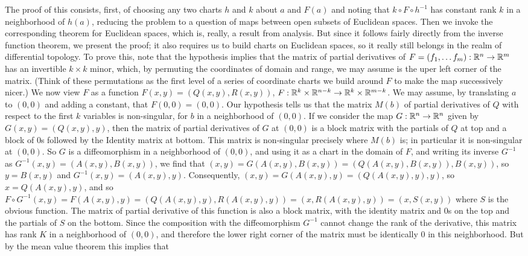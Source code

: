 The proof of this consists, first, of choosing any two charts $h$ and $k$ about $a$ and 
$F(a)$ and noting that $k\circ F\circ h^{-1}$ has constant rank $k$ in a 
neighborhood of $h(a)$, reducing the problem to a question of maps between open subsets of Euclidean 
spaces. Then we invoke the corresponding theorem for Euclidean spaces, which is,
really, a result from analysis. But since it follows fairly directly from the
inverse function theorem, we present the proof; it also requires us to build charts
on Euclidean spaces, so it really still belongs in the realm of differential topology.
To prove this, note that the hypothesis implies that the matrix of partial derivatives
of $F=(f_1,\ldots f_m):{\Bbb R}^n\rightarrow {\Bbb R}^m$ has an invertible $k\times k$ minor, which, by
permuting the coordinates of domain and range, we may assume is the uper left corner
of the matrix. (Think of these permutations as the first level of a series of coordinate
charts we build around $F$ to make the map successively nicer.) We now view $F$ as a 
function $F(x,y)=(Q(x,y),R(x,y))$,
$F:{\Bbb R}^k\times {\Bbb R}^{n-k}\rightarrow {\Bbb R}^k\times {\Bbb R}^{m-k}$. We may assume, by translating 
$a$ to $(0,0)$ and adding a constant,
that $F(0,0)=(0,0)$.
Our hypothesis tells us that the matrix $M(b)$ of partial derivatives of $Q$ with respect to the
first $k$ variables is non-singular, for $b$ in a neighborhood of $(0,0)$. 
If we consider the map $G:{\Bbb R}^n\rightarrow {\Bbb R}^n$ given
by $G(x,y)=(Q(x,y),y)$, then the matrix of partial derivatives of $G$ at $(0,0)$ is a 
block matrix with the partials of $Q$ at top and a block of $0$s followed by the Identity 
matrix at bottom. This matrix is non-singular precisely where $M(b)$ is; in particular it is
non-singular at $(0,0)$. So $G$ is a diffeomorphism in a neighborhood of $(0,0)$,
and using it as a chart in the domain of $F$, and writing its inverse $G^{-1}$ as
$G^{-1}(x,y)=(A(x,y),B(x,y))$, we find that 
$(x,y)=G(A(x,y),B(x,y))=(Q(A(x,y),B(x,y)),B(x,y))$, so $y=B(x,y)$ and $G^{-1}(x,y)=(A(x,y),y)$.
Consequently, $(x,y)=G(A(x,y),y)=(Q(A(x,y),y),y)$, so $x=Q(A(x,y),y)$, and so
$F\circ G^{-1}(x,y)=F(A(x,y),y)=(Q(A(x,y),y),R(A(x,y),y))=(x,R(A(x,y),y))=(x,S(x,y))$ where $S$ is the
obvious function. The matrix of partial derivative of this function is also a block matrix, with
the identity matrix and $0$s on the top and the partials of $S$ on the bottom. Since the composition with
the diffeomorphism $G^{-1}$ cannot change the rank of the derivative, this matrix has rank $K$
in a neighborhood of $(0,0)$, and therefore the lower right corner of the matrix must be
identically $0$ in this neighborhood. But by the mean value theorem this implies that
